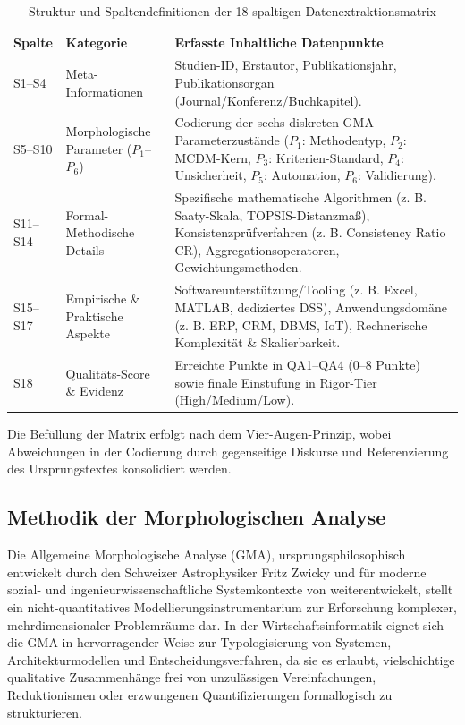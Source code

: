 \begin{table}[htbp]
\centering
\small
\caption{Struktur und Spaltendefinitionen der 18-spaltigen Datenextraktionsmatrix}
\label{tab:extraktionsmatrix_struktur}
\begin{tabularx}{\textwidth}{p{1.2cm} p{3.8cm} X}
\toprule
\textbf{Spalte} & \textbf{Kategorie} & \textbf{Erfasste Inhaltliche Datenpunkte} \\
\midrule
S1--S4 & Meta-Informationen & Studien-ID, Erstautor, Publikationsjahr, Publikationsorgan (Journal/Konferenz/Buchkapitel). \\
\midrule
S5--S10 & Morphologische Parameter ($P_1$--$P_6$) & Codierung der sechs diskreten GMA-Parameterzustände ($P_1$: Methodentyp, $P_2$: MCDM-Kern, $P_3$: Kriterien-Standard, $P_4$: Unsicherheit, $P_5$: Automation, $P_6$: Validierung). \\
\midrule
S11--S14 & Formal-Methodische Details & Spezifische mathematische Algorithmen (z. B. Saaty-Skala, TOPSIS-Distanzmaß), Konsistenzprüfverfahren (z. B. Consistency Ratio CR), Aggregationsoperatoren, Gewichtungsmethoden. \\
\midrule
S15--S17 & Empirische \& Praktische Aspekte & Softwareunterstützung/Tooling (z. B. Excel, MATLAB, dediziertes DSS), Anwendungsdomäne (z. B. ERP, CRM, DBMS, IoT), Rechnerische Komplexität \& Skalierbarkeit. \\
\midrule
S18 & Qualitäts-Score \& Evidenz & Erreichte Punkte in QA1--QA4 (0--8 Punkte) sowie finale Einstufung in Rigor-Tier (High/Medium/Low). \\
\bottomrule
\end{tabularx}
\end{table}

Die Befüllung der Matrix erfolgt nach dem Vier-Augen-Prinzip, wobei Abweichungen in der Codierung durch gegenseitige Diskurse und Referenzierung des Ursprungstextes konsolidiert werden.

\subsection{Methodik der Morphologischen Analyse}
\label{subsec:methodik_morphologische_analyse}

Die Allgemeine Morphologische Analyse (GMA), ursprungsphilosophisch entwickelt durch den Schweizer Astrophysiker Fritz Zwicky und für moderne sozial- und ingenieurwissenschaftliche Systemkontexte von \cite{Z6N6V5L9} weiterentwickelt, stellt ein nicht-quantitatives Modellierungsinstrumentarium zur Erforschung komplexer, mehrdimensionaler Problemräume dar. In der Wirtschaftsinformatik eignet sich die GMA in hervorragender Weise zur Typologisierung von Systemen, Architekturmodellen und Entscheidungsverfahren, da sie es erlaubt, vielschichtige qualitative Zusammenhänge frei von unzulässigen Vereinfachungen, Reduktionismen oder erzwungenen Quantifizierungen formallogisch zu strukturieren.

